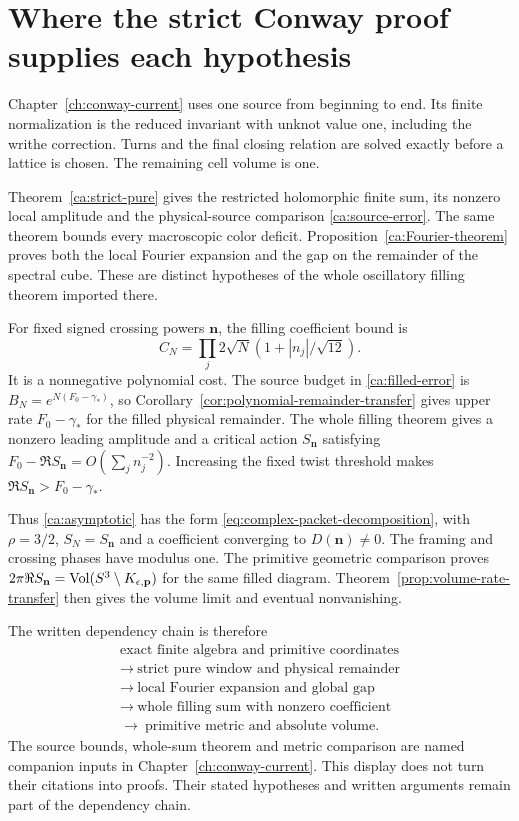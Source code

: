 \section{Where the strict Conway proof supplies each hypothesis}

Chapter~\ref{ch:conway-current} uses one source from beginning to
end. Its finite normalization is the reduced invariant with unknot
value one, including the writhe correction. Turns and the final
closing relation are solved exactly before a lattice is chosen.
The remaining cell volume is one.

Theorem~\ref{ca:strict-pure} gives the restricted holomorphic finite sum,
its nonzero local amplitude and the physical-source comparison
\eqref{ca:source-error}. The same theorem bounds every macroscopic
color deficit. Proposition~\ref{ca:Fourier-theorem} proves both
the local Fourier expansion and the gap on the remainder of the
spectral cube. These are distinct hypotheses of the whole
oscillatory filling theorem imported there.

For fixed signed crossing powers $\mathbf n$, the filling
coefficient bound is
\[
 C_N=\prod_j2\sqrt N(1+|n_j|/\sqrt{12}).
\]
It is a nonnegative polynomial cost. The source budget in
\eqref{ca:filled-error} is
$B_N=e^{N(F_0-\gamma_*)}$, so
Corollary~\ref{cor:polynomial-remainder-transfer} gives upper rate
$F_0-\gamma_*$ for the filled physical remainder. The whole filling
theorem gives a nonzero leading amplitude and a critical action
$S_{\mathbf n}$ satisfying
$F_0-\Re S_{\mathbf n}=O(\sum_jn_j^{-2})$.
Increasing the fixed twist threshold makes
$\Re S_{\mathbf n}>F_0-\gamma_*$.

Thus \eqref{ca:asymptotic} has the form
\eqref{eq:complex-packet-decomposition}, with
$\rho=3/2$, $S_N=S_{\mathbf n}$ and a coefficient converging to
$D(\mathbf n)\ne0$. The framing and crossing phases have modulus
one. The primitive geometric comparison proves
$2\pi\Re S_{\mathbf n}=\operatorname{Vol}(S^3\setminus K_{\epsilon,\mathbf p})$
for the same filled diagram. Theorem~\ref{prop:volume-rate-transfer}
then gives the volume limit and eventual nonvanishing.

The written dependency chain is therefore
\[
 \begin{gathered}
 \text{exact finite algebra and primitive coordinates}\\
 \longrightarrow\ \text{strict pure window and physical remainder}\\
 \longrightarrow\ \text{local Fourier expansion and global gap}\\
 \longrightarrow\ \text{whole filling sum with nonzero coefficient}\\
 \longrightarrow\ \text{primitive metric and absolute volume}.
 \end{gathered}
\]
The source bounds, whole-sum theorem and metric comparison are named
companion inputs in Chapter~\ref{ch:conway-current}. This display
does not turn their citations into proofs. Their stated hypotheses
and written arguments remain part of the dependency chain.

